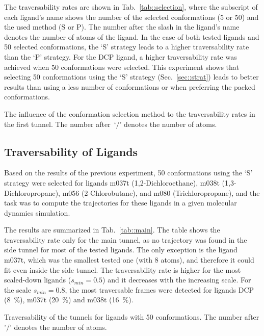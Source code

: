 \documentclass[usletter, 10pt, conference]{ieeeconf} %
\def\smin{s_{min}}
\begin{document}
The traversability rates are shown in Tab.~\ref{tab::selection}, where the subscript of each ligand's 
name shows the number of the selected conformations (5 or 50) and the used method (S or P).
The number after the slash in the ligand's name denotes the number of atoms of the ligand.
In the case of both tested ligands and 50 selected conformations, the `S' strategy leads to a higher traversability rate than the `P' strategy.
For the DCP ligand, a higher traversability rate was achieved when 50 conformations were selected.
This experiment shows that selecting 50 conformations using the `S' strategy (Sec.~\ref{sec::strat}) leads to better results
than using a less number of conformations or when preferring the packed conformations.

\begin{table}[ht]
\centering
\caption{\label{tab::selection}
    The influence of the conformation selection method to the traversability rates in the first tunnel.
    The number after~`$/$' denotes the number of atoms.
}
\small
\renewcommand{\tabcolsep}{4.3pt}
{\small
\renewcommand{\arraystretch}{0.7}

}
\end{table}


\subsection{Traversability of Ligands}

Based on the results of the previous experiment, 50 conformations using the `S' strategy were selected for ligands m037t (1,2-Dichloroethane), m038t (1,3-Dichloropropane), m056 (2-Chlorobutane), and m080 (Trichloropropane), and
the task was to compute the trajectories for these ligands in a given molecular dynamics simulation.

The results are summarized in Tab.~\ref{tab::main}.
The table shows the traversability rate only for the main tunnel, as no trajectory was found in the side tunnel for most of the tested ligands.
The only exception is the ligand m037t, which was the smallest tested one (with 8 atoms), and therefore it could fit even inside the side tunnel.
The traversability rate is higher for the most scaled-down ligands ($\smin=0.5$) and it decreases with the increasing scale.
For the scale $\smin=0.8$, the most traversable frames were detected for ligands DCP (8~\%), m037t (20~\%) and m038t (16~\%).

\begin{table}[ht]
\centering
\caption{\label{tab::main}
    Traversability of the tunnels for ligands with 50 conformations. 
    The number after '$/$' denotes the number of atoms.
}
\small
\renewcommand{\tabcolsep}{4.3pt}
{\small
\renewcommand{\arraystretch}{0.7}

}
\end{table}
\end{document}
